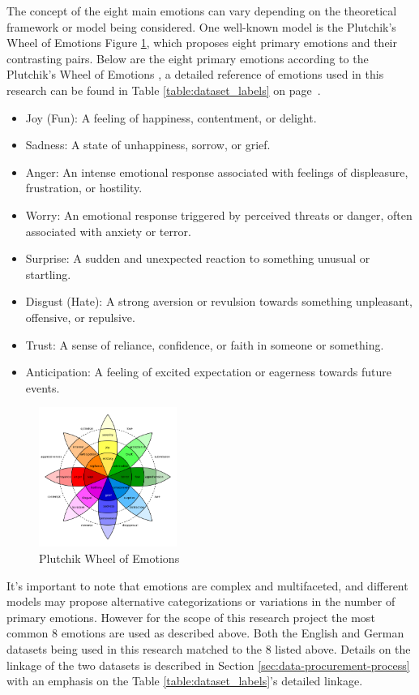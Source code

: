 \documentclass[11pt]{article}
\begin{document}
The concept of the eight main emotions can vary depending on the theoretical framework or model being considered. One well-known model is the Plutchik's Wheel of Emotions Figure \ref{fig:plutchik-wheel}, which proposes eight primary emotions and their contrasting pairs. Below are the eight primary emotions according to the Plutchik's Wheel of Emotions \cite{Tromp}, a detailed reference of emotions used in this research can be found in Table \ref{table:dataset_labels} on page~\pageref{table:dataset_labels}.

\begin{itemize}
\item Joy (Fun): A feeling of happiness, contentment, or delight.
\item Sadness: A state of unhappiness, sorrow, or grief.
\item Anger: An intense emotional response associated with feelings of displeasure, frustration, or hostility.
\item Worry: An emotional response triggered by perceived threats or danger, often associated with anxiety or terror.
\item Surprise: A sudden and unexpected reaction to something unusual or startling.
\item Disgust (Hate): A strong aversion or revulsion towards something unpleasant, offensive, or repulsive.
\item Trust: A sense of reliance, confidence, or faith in someone or something.
\item Anticipation: A feeling of excited expectation or eagerness towards future events.
\end{itemize}

\begin{figure}[h]
    \centering
    \includegraphics[width=0.4\textwidth]{Plutchik-Wheel}
    \caption{Plutchik Wheel of Emotions}
    \label{fig:plutchik-wheel}
\end{figure}

It's important to note that emotions are complex and multifaceted, and different models may propose alternative categorizations or variations in the number of primary emotions. However for the scope of this research project the most common 8 emotions are used as described above. Both the English \cite{english-dataset-twitter} and German \cite{german-dataset-cheese} datasets being used in this research matched to the 8 listed above. Details on the linkage of the two datasets is described in Section \ref{sec:data-procurement-process} with an emphasis on the Table \ref{table:dataset_labels}'s detailed linkage.
\end{document}
